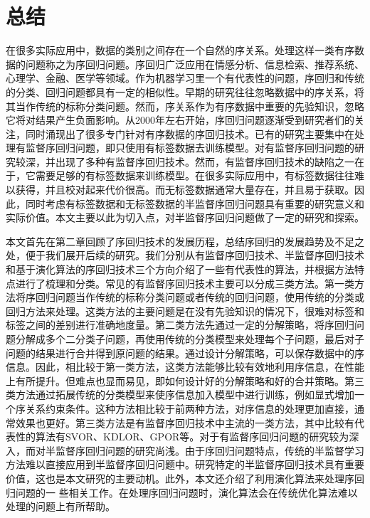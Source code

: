 \chapter{总结}
\label{chap:conclusion}

在很多实际应用中，数据的类别之间存在一个自然的序关系。处理这样一类有序数据的问题称之为序回归问题。序回归广泛应用在情感分析、信息检索、推荐系统、心理学、金融、医学等领域。作为机器学习里一个有代表性的问题，序回归和传统的分类、回归问题都具有一定的相似性。早期的研究往往忽略数据中的序关系，将其当作传统的标称分类问题。然而，序关系作为有序数据中重要的先验知识，忽略它将对结果产生负面影响。从2000年左右开始，序回归问题逐渐受到研究者们的关注，同时涌现出了很多专门针对有序数据的序回归技术。已有的研究主要集中在处理有监督序回归问题，即只使用有标签数据去训练模型。对有监督序回归问题的研究较深，并出现了多种有监督序回归技术。然而，有监督序回归技术的缺陷之一在于，它需要足够的有标签数据来训练模型。在很多实际应用中，有标签数据往往难以获得，并且校对起来代价很高。而无标签数据通常大量存在，并且易于获取。因此，同时考虑有标签数据和无标签数据的半监督序回归问题具有重要的研究意义和实际价值。本文主要以此为切入点，对半监督序回归问题做了一定的研究和探索。

本文首先在第二章回顾了序回归技术的发展历程，总结序回归的发展趋势及不足之处，便于我们展开后续的研究。我们分别从有监督序回归技术、半监督序回归技术和基于演化算法的序回归技术三个方向介绍了一些有代表性的算法，并根据方法特点进行了梳理和分类。常见的有监督序回归技术主要可以分成三类方法。第一类方法将序回归问题当作传统的标称分类问题或者传统的回归问题，使用传统的分类或回归方法来处理。这类方法的主要问题是在没有先验知识的情况下，很难对标签和标签之间的差别进行准确地度量。第二类方法先通过一定的分解策略，将序回归问题分解成多个二分类子问题，再使用传统的分类模型来处理每个子问题，最后对子问题的结果进行合并得到原问题的结果。通过设计分解策略，可以保存数据中的序信息。因此，相比较于第一类方法，这类方法能够比较有效地利用序信息，在性能上有所提升。但难点也显而易见，即如何设计好的分解策略和好的合并策略。第三类方法通过拓展传统的分类模型来使序信息加入模型中进行训练，例如显式增加一个序关系约束条件。这种方法相比较于前两种方法，对序信息的处理更加直接，通常效果也更好。第三类方法是有监督序回归技术中主流的一类方法，其中比较有代表性的算法有SVOR、KDLOR、GPOR等。对于有监督序回归问题的研究较为深入，而对半监督序回归问题的研究尚浅。由于序回归问题特点，传统的半监督学习方法难以直接应用到半监督序回归问题中。研究特定的半监督序回归技术具有重要价值，这也是本文研究的主要动机。此外，本文还介绍了利用演化算法来处理序回归问题的一 些相关工作。在处理序回归问题时，演化算法会在传统优化算法难以处理的问题上有所帮助。

